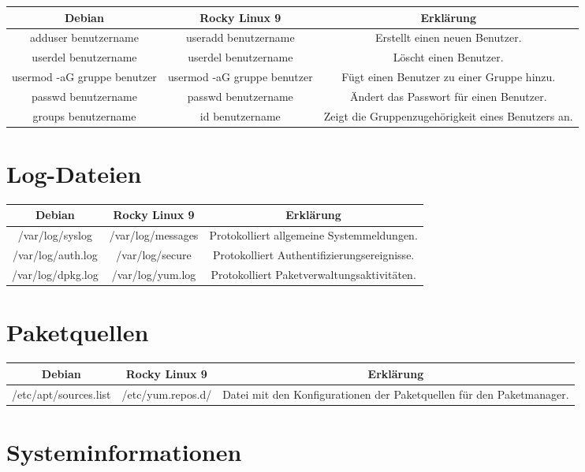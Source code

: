 \documentclass{article}
\begin{document}
\begin{tabularx}{\textwidth}{CCC}
  \textbf{Debian} & \textbf{Rocky Linux 9} & \textbf{Erklärung} \\
  \hline
  adduser benutzername & useradd benutzername & Erstellt einen neuen Benutzer. \\
  userdel benutzername & userdel benutzername & Löscht einen Benutzer. \\
  usermod -aG gruppe benutzer & usermod -aG gruppe benutzer & Fügt einen Benutzer zu einer Gruppe hinzu. \\
  passwd benutzername & passwd benutzername & Ändert das Passwort für einen Benutzer. \\
  groups benutzername & id benutzername & Zeigt die Gruppenzugehörigkeit eines Benutzers an. \\
\end{tabularx}

\section*{Log-Dateien}

\begin{tabularx}{\textwidth}{CCC}
  \textbf{Debian} & \textbf{Rocky Linux 9} & \textbf{Erklärung} \\
  \hline
  /var/log/syslog & /var/log/messages & Protokolliert allgemeine Systemmeldungen. \\
  /var/log/auth.log & /var/log/secure & Protokolliert Authentifizierungsereignisse. \\
  /var/log/dpkg.log & /var/log/yum.log & Protokolliert Paketverwaltungsaktivitäten. \\
\end{tabularx}

\section*{Paketquellen}

\begin{tabularx}{\textwidth}{CCC}
  \textbf{Debian} & \textbf{Rocky Linux 9} & \textbf{Erklärung} \\
  \hline
  /etc/apt/sources.list & /etc/yum.repos.d/ & Datei mit den Konfigurationen der Paketquellen für den Paketmanager. \\
\end{tabularx}


\section*{Systeminformationen}
\end{document}
